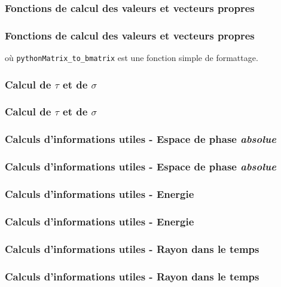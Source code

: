 \documentclass{beamer}
\begin{document}
	\subsubsection{Fonctions de calcul des valeurs et vecteurs propres}
	\begin{frame}[fragile]
		\frametitle{Fonctions de calcul des valeurs et vecteurs propres}
		
		{\scriptsize où \verb|pythonMatrix_to_bmatrix| est une fonction simple de formattage.}
	\end{frame}
	
	\subsubsection{Calcul de $\tau$ et de $\sigma$}
	\begin{frame}
		\frametitle{Calcul de $\tau$ et de $\sigma$}
		
	\end{frame}
	
	\subsubsection{Calculs d'informations utiles - Espace de phase \textit{absolue}}
	\begin{frame}
		\frametitle{Calculs d'informations utiles - Espace de phase \textit{absolue}}
		
	\end{frame}
	
	\subsubsection{Calculs d'informations utiles - Energie}
	\begin{frame}
		\frametitle{Calculs d'informations utiles - Energie}
		
	\end{frame}
	
	\subsubsection{Calculs d'informations utiles - Rayon dans le temps}
	\begin{frame}
		\frametitle{Calculs d'informations utiles - Rayon dans le temps}
		
	\end{frame}
	
\end{document}
